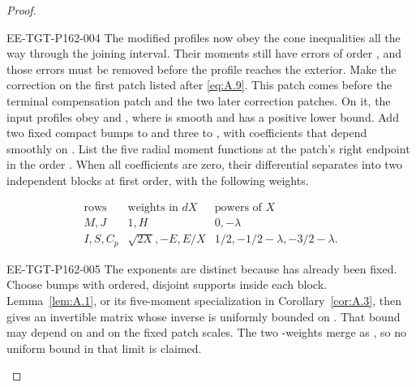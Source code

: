 \begin{proof}
\begin{EESegment}{EE-TGT-P162-004}
The modified profiles now obey the cone inequalities all the way through the joining interval. Their
moments still have errors of order , and those errors must be removed before the profile reaches the exterior.
Make the correction on the first patch listed after \eqref{eq:A.9}. This patch comes before the terminal compensation
patch and the two later correction patches. On it, the input profiles obey
 and
, where  is smooth and has a positive lower bound. Add two fixed
compact bumps to  and three to , with coefficients that depend smoothly on
. List the
five radial moment functions at the patch's right endpoint in the order . When all coefficients are zero,
their differential separates into two independent blocks at first order, with the following weights.
\end{EESegment}
\[
\begin{array}{c|c|c}
 \text{rows} & \text{weights in }dX & \text{powers of }X\\ \hline
 M,J & 1,H & 0,-\lambda\\
 I,S,C_p & \sqrt{2X},-E,E/X & 1/2,-1/2-\lambda,-3/2-\lambda.
\end{array}
\]
\begin{EESegment}{EE-TGT-P162-005}
The exponents are distinct because  has already been fixed. Choose bumps with ordered,
disjoint supports inside each block. Lemma~\ref{lem:A.1}, or its five-moment specialization in Corollary~\ref{cor:A.3}, then gives an invertible matrix whose inverse is uniformly bounded on
. That
bound may depend on  and on the fixed patch scales. The two
-weights merge as , so no uniform bound in that limit is claimed.
\end{EESegment}


\end{proof}
